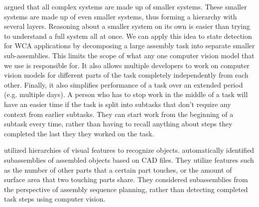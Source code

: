 \citet{Simon1991} argued that all complex systems are made up of smaller
systems. These smaller systems are made up of even smaller systems, thus
forming a hierarchy with several layers.
Reasoning about a smaller system on its own is easier than trying to understand
a full system all at once.
We can apply this idea to state detection for WCA applications by decomposing
a large assembly task into separate smaller sub-assemblies.
This limits the scope of what any one computer vision model that we use is
responsible for.
It also allows multiple developers to work on computer vision models for
different parts of the task completely independently from each other.
Finally, it also simplifies performance of a task over an extended period
(e.g. multiple days). A person who has to stop work in the middle of a task will
have an easier time if the task is split into subtasks that don't require any
context from earlier subtasks. They can start work from the beginning of a
subtask every time, rather than having to recall anything about steps they
completed the last they they worked on the task.

\citet{semantic_hierarchy} utilized hierarchies of visual features to recognize
objects.
\citet{subassembly_identification} automatically identified subassemblies of
assembled objects based on CAD files.
They utilize features such as the number of other parts that a certain part
touches, or the amount of surface area that two touching parts share.
They considered subassemblies from the perspective of assembly sequence
planning, rather than detecting completed task steps using computer vision.
